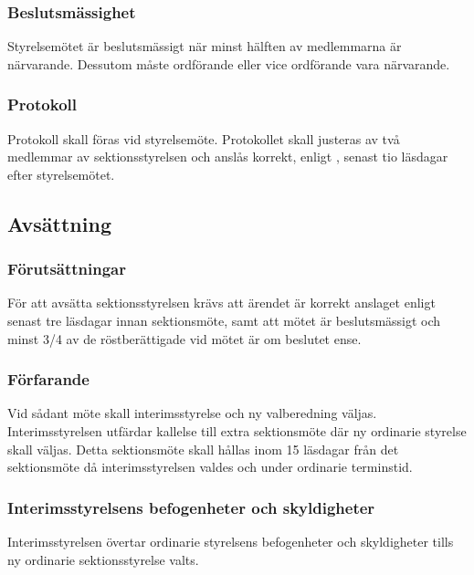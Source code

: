 \subsubsection{Beslutsmässighet}
Styrelsemötet är beslutsmässigt när minst hälften av medlemmarna är närvarande. Dessutom måste ordförande eller vice ordförande vara närvarande.

\subsubsection{Protokoll}
Protokoll skall föras vid styrelsemöte. Protokollet skall justeras av två medlemmar av sektionsstyrelsen och anslås korrekt, enligt , senast tio läsdagar efter styrelsemötet.

\subsection{Avsättning}

\subsubsection{Förutsättningar}
För att avsätta sektionsstyrelsen krävs att ärendet är korrekt anslaget enligt  senast tre läsdagar innan sektionsmöte, samt att mötet är beslutsmässigt och minst 3/4 av de röstberättigade vid mötet är om beslutet ense. 

\subsubsection{Förfarande}
Vid sådant möte skall interimsstyrelse och ny valberedning väljas. Interimsstyrelsen utfärdar kallelse till extra sektionsmöte där ny ordinarie styrelse skall väljas. Detta sektionsmöte skall hållas inom 15 läsdagar från det sektionsmöte då interimsstyrelsen valdes och under ordinarie terminstid.

\subsubsection{Interimsstyrelsens befogenheter och skyldigheter}
Interimsstyrelsen övertar ordinarie styrelsens befogenheter och skyldigheter tills ny ordinarie sektionsstyrelse valts.


